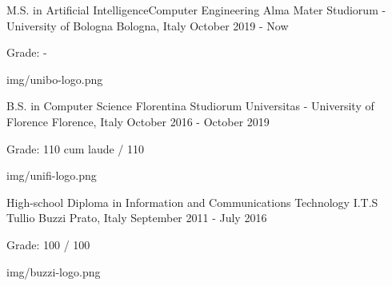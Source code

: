 
\begin{cventries}

  \logocventry
    {M.S. in Artificial Intelligence{\enskip\cdotp\enskip}Computer Engineering}
    {Alma Mater Studiorum - University of Bologna}
    {Bologna, Italy}
    {October 2019 - Now}
    {
      \begin{cvitems}
        \item {Grade: -}
      \end{cvitems}
    }
    {img/unibo-logo.png}

  \logocventry
    {B.S. in Computer Science}
    {Florentina Studiorum Universitas - University of Florence}
    {Florence, Italy}
    {October 2016 - October 2019}
    {
      \begin{cvitems}
        \item {Grade: 110 cum laude / 110}
      \end{cvitems}
    }
    {img/unifi-logo.png}

  \logocventry
    {High-school Diploma in Information and Communications Technology}
    {I.T.S Tullio Buzzi}
    {Prato, Italy}
    {September 2011 - July 2016}
    {
      \begin{cvitems}
        \item {Grade: 100 / 100}
      \end{cvitems}
    }
    {img/buzzi-logo.png}

\end{cventries}
